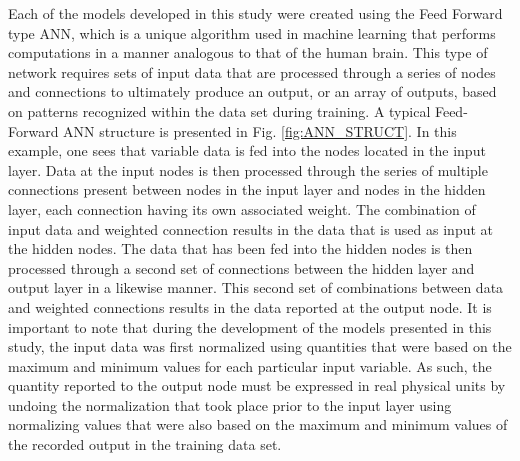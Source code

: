 \documentclass[
10pt, %
letterpaper, %
twoside, %
headinclude,footinclude, %
BCOR5mm, %
]{scrartcl}
\begin{document}
Each of the models developed in this study were created using the Feed Forward type ANN, which is a unique algorithm used in machine learning that performs computations in a manner analogous to that of the human brain. This type of network requires sets of input data that are processed through a series of nodes and connections to ultimately produce an output, or an array of outputs, based on patterns recognized within the data set during training. A typical Feed-Forward ANN structure is presented in Fig. \ref{fig:ANN_STRUCT}. In this example, one sees that variable data is fed into the nodes located in the input layer. Data at the input nodes is then processed through the series of multiple connections present between nodes in the input layer and nodes in the hidden layer, each connection having its own associated weight. The combination of input data and weighted connection results in the data that is used as input at the hidden nodes. The data that has been fed into the hidden nodes is then processed through a second set of connections between the hidden layer and output layer in a likewise manner. This second set of combinations between data and weighted connections results in the data reported at the output node. It is important to note that during the development of the models presented in this study, the input data was first normalized using quantities that were based on the maximum and minimum values for each particular input variable. As such, the quantity reported to the output node must be expressed in real physical units by undoing the normalization that took place prior to the input layer using normalizing values that were also based on the maximum and minimum values of the recorded output in the training data set.
\end{document}
